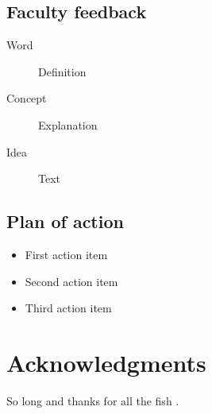 \documentclass[fleqn,10pt]{SelfArx}\usepackage[]{graphicx}\usepackage[]{color}
\begin{document}
\subsection{Faculty feedback}
\lipsum[1] %

\begin{description}
\item[Word] Definition
\item[Concept] Explanation
\item[Idea] Text
\end{description}

\lipsum[1] %

\subsection{Plan of action}
\lipsum[1] %
\begin{itemize}[noitemsep] %
\item First action item
\item Second action item
\item Third action item
\end{itemize}

\section*{Acknowledgments} %


So long and thanks for all the fish \citep{Figueredo:2009dg}.

\printbibliography[title={References},heading=bibintoc]


\end{document}
